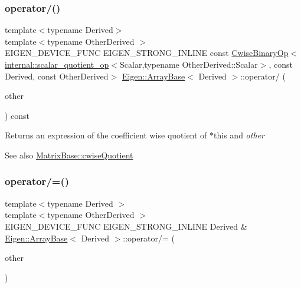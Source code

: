 \subsubsection{\texorpdfstring{operator/()}{operator/()}}
{\footnotesize\ttfamily template$<$typename Derived$>$ \\
template$<$typename Other\+Derived $>$ \\
E\+I\+G\+E\+N\+\_\+\+D\+E\+V\+I\+C\+E\+\_\+\+F\+U\+NC E\+I\+G\+E\+N\+\_\+\+S\+T\+R\+O\+N\+G\+\_\+\+I\+N\+L\+I\+NE const \mbox{\hyperlink{class_eigen_1_1_cwise_binary_op}{Cwise\+Binary\+Op}}$<$\mbox{\hyperlink{struct_eigen_1_1internal_1_1scalar__quotient__op}{internal\+::scalar\+\_\+quotient\+\_\+op}}$<$Scalar,typename Other\+Derived\+::\+Scalar$>$, const Derived, const Other\+Derived$>$ \mbox{\hyperlink{class_eigen_1_1_array_base}{Eigen\+::\+Array\+Base}}$<$ Derived $>$\+::operator/ (\begin{DoxyParamCaption}\item[{const E\+I\+G\+E\+N\+\_\+\+C\+U\+R\+R\+E\+N\+T\+\_\+\+S\+T\+O\+R\+A\+G\+E\+\_\+\+B\+A\+S\+E\+\_\+\+C\+L\+A\+SS$<$ Other\+Derived $>$ \&}]{other }\end{DoxyParamCaption}) const\hspace{0.3cm}{\ttfamily [inline]}}

\begin{DoxyReturn}{Returns}
an expression of the coefficient wise quotient of {\ttfamily $\ast$this} and {\itshape other} 
\end{DoxyReturn}
\begin{DoxySeeAlso}{See also}
\mbox{\hyperlink{class_eigen_1_1_matrix_base_ad2a4070503e44b1f9e7fc99b4cb5697b}{Matrix\+Base\+::cwise\+Quotient}} 
\end{DoxySeeAlso}
\mbox{\label{class_eigen_1_1_array_base_a91860c840ac453449c1ac65fc61065f8}} 
\subsubsection{\texorpdfstring{operator/=()}{operator/=()}}
{\footnotesize\ttfamily template$<$typename Derived $>$ \\
template$<$typename Other\+Derived $>$ \\
E\+I\+G\+E\+N\+\_\+\+D\+E\+V\+I\+C\+E\+\_\+\+F\+U\+NC E\+I\+G\+E\+N\+\_\+\+S\+T\+R\+O\+N\+G\+\_\+\+I\+N\+L\+I\+NE Derived \& \mbox{\hyperlink{class_eigen_1_1_array_base}{Eigen\+::\+Array\+Base}}$<$ Derived $>$\+::operator/= (\begin{DoxyParamCaption}\item[{const \mbox{\hyperlink{class_eigen_1_1_array_base}{Array\+Base}}$<$ Other\+Derived $>$ \&}]{other }\end{DoxyParamCaption})}

